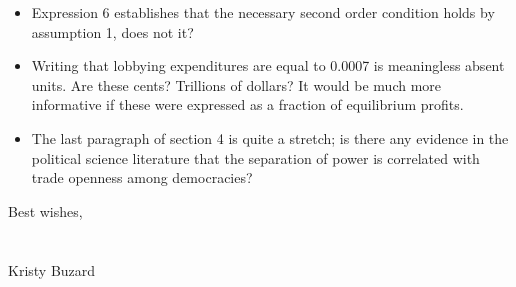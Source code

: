 \documentclass[12pt]{report}
\begin{document}
\begin{itemize}
  \item Expression 6 establishes that the necessary second order condition holds by assumption 1, does not it?
  \item Writing that lobbying expenditures are equal to 0.0007 is meaningless absent units. Are these cents? Trillions of dollars? It would be much more informative if these were expressed as a fraction of equilibrium profits.
  \item The last paragraph of section 4 is quite a stretch; is there any evidence in the political science literature that the separation of power is correlated with trade openness among democracies?
\end{itemize}


Best wishes,\\
\\
\\
Kristy Buzard
\end{document}
